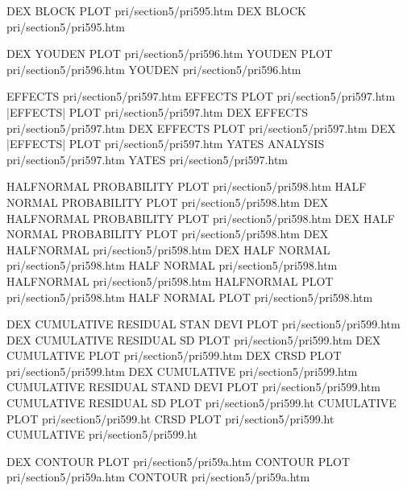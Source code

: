 DEX BLOCK PLOT                          pri/section5/pri595.htm
DEX BLOCK                               pri/section5/pri595.htm

DEX YOUDEN PLOT                         pri/section5/pri596.htm
YOUDEN PLOT                             pri/section5/pri596.htm
YOUDEN                                  pri/section5/pri596.htm

EFFECTS                                 pri/section5/pri597.htm
EFFECTS PLOT                            pri/section5/pri597.htm
|EFFECTS| PLOT                          pri/section5/pri597.htm
DEX EFFECTS                             pri/section5/pri597.htm
DEX EFFECTS PLOT                        pri/section5/pri597.htm
DEX |EFFECTS| PLOT                      pri/section5/pri597.htm
YATES ANALYSIS                          pri/section5/pri597.htm
YATES                                   pri/section5/pri597.htm

HALFNORMAL PROBABILITY PLOT             pri/section5/pri598.htm
HALF NORMAL PROBABILITY PLOT            pri/section5/pri598.htm
DEX HALFNORMAL PROBABILITY PLOT         pri/section5/pri598.htm
DEX HALF NORMAL PROBABILITY PLOT        pri/section5/pri598.htm
DEX HALFNORMAL                          pri/section5/pri598.htm
DEX HALF NORMAL                         pri/section5/pri598.htm
HALF NORMAL                             pri/section5/pri598.htm
HALFNORMAL                              pri/section5/pri598.htm
HALFNORMAL PLOT                         pri/section5/pri598.htm
HALF NORMAL PLOT                        pri/section5/pri598.htm

DEX CUMULATIVE RESIDUAL STAN DEVI PLOT  pri/section5/pri599.htm
DEX CUMULATIVE RESIDUAL SD PLOT         pri/section5/pri599.htm
DEX CUMULATIVE PLOT                     pri/section5/pri599.htm
DEX CRSD PLOT                           pri/section5/pri599.htm
DEX CUMULATIVE                          pri/section5/pri599.htm
CUMULATIVE RESIDUAL STAND DEVI PLOT     pri/section5/pri599.htm
CUMULATIVE RESIDUAL SD PLOT             pri/section5/pri599.ht
CUMULATIVE PLOT                         pri/section5/pri599.ht
CRSD PLOT                               pri/section5/pri599.ht
CUMULATIVE                              pri/section5/pri599.ht

DEX CONTOUR PLOT                        pri/section5/pri59a.htm
CONTOUR PLOT                            pri/section5/pri59a.htm
CONTOUR                                 pri/section5/pri59a.htm

